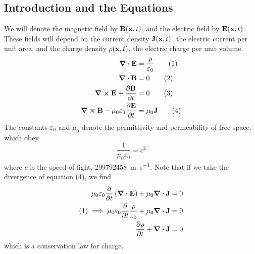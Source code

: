 \subsection{Introduction and the Equations}
We will denote the magnetic field by \(\vb B(\vb x, t)\), and the electric field by \(\vb E(\vb x, t)\).
These fields will depend on the current density \(\vb J(\vb x, t)\), the electric current per unit area, and the charge density \(\rho(\vb x, t)\), the electric charge per unit volume.
\begin{align}
	\div{\vb E}                                      & = \frac{\rho}{\varepsilon_0} \tag{1} \\
	\div{\vb B}                                      & = 0                          \tag{2} \\
	\curl{\vb E} + \pdv{\vb B}{t}                    & = 0                          \tag{3} \\
	\curl{\vb B} - \mu_0\varepsilon_0 \pdv{\vb E}{t} & = \mu_0 \vb J \tag{4}
\end{align}
The constants \(\varepsilon_0\) and \(\mu_0\) denote the permittivity and permeability of free space, which obey
\[
	\frac{1}{\mu_0 \varepsilon_0} = c^2
\]
where \(c\) is the speed of light, \SI{299792458}{\metre\per\second}.
Note that if we take the divergence of equation (4), we find
\begin{align*}
	\mu_0 \varepsilon_0 \pdv{t}\left( \div{\vb E} \right) + \mu_0 \div{\vb J}              & = 0 \\
	(1) \implies \mu_0 \varepsilon_0 \pdv{t}\frac{\rho}{\varepsilon_0} + \mu_0 \div{\vb J} & = 0 \\
	\pdv{\rho}{t} + \div{\vb J}                                                            & = 0 \\
\end{align*}
which is a conservation law for charge.

